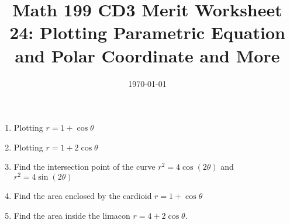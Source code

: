 
\usepackage{fullpage,amsmath,amssymb,amsthm}

\newcommand{\D}{\displaystyle}

\title{Math 199 CD3 Merit Worksheet 24: Plotting Parametric Equation and Polar Coordinate and More}
\date{\today}



\maketitle
\begin{enumerate}
	\item Plotting $r=1+\cos \theta$
	\vfill
	\item Plotting $r=1+2\cos \theta$
	\vfill
	\newpage
	\item Find the intersection point of the curve $r^2=4\cos (2\theta)$ and $r^2=4\sin (2\theta)$
	\vfill

	\item Find the area enclosed by the cardioid $r=1+\cos \theta$
	\vfill
	\item Find the area inside the limacon $r = 4 + 2\cos \theta$.
	\vfill
\end{enumerate}
